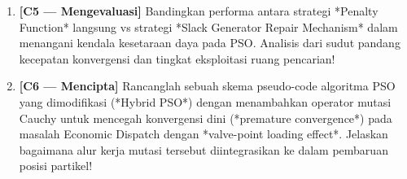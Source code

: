 \documentclass[11pt,a4paper]{article}
\begin{document}
\begin{enumerate}[label=\textbf{Soal \arabic*:}, leftmargin=*, resume]
    \item \textbf{[C5 --- Mengevaluasi]} Bandingkan performa antara strategi *Penalty Function* langsung vs strategi *Slack Generator Repair Mechanism* dalam menangani kendala kesetaraan daya pada PSO. Analisis dari sudut pandang kecepatan konvergensi dan tingkat eksploitasi ruang pencarian!
    
    \begin{tcolorbox}[colback=white,colframe=gray!50,height=4cm,title=Ruang Jawaban Soal 5]
    \end{tcolorbox}

    \item \textbf{[C6 --- Mencipta]} Rancanglah sebuah skema pseudo-code algoritma PSO yang dimodifikasi (*Hybrid PSO*) dengan menambahkan operator mutasi Cauchy untuk mencegah konvergensi dini (*premature convergence*) pada masalah Economic Dispatch dengan *valve-point loading effect*. Jelaskan bagaimana alur kerja mutasi tersebut diintegrasikan ke dalam pembaruan posisi partikel!
    
    \begin{tcolorbox}[colback=white,colframe=gray!50,height=6.5cm,title=Ruang Jawaban Soal 6]
    \end{tcolorbox}
\end{enumerate}
\end{document}
